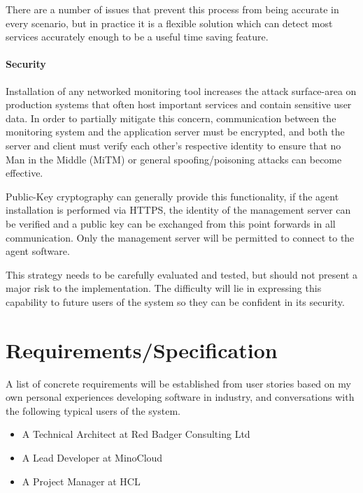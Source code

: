 \documentclass{cshonours}
\begin{document}
There are a number of issues that prevent this process from being accurate in every scenario, but in practice it is a flexible solution which can detect most services accurately enough to be a useful time saving feature.

\paragraph{Security} Installation of any networked monitoring tool increases the attack surface-area on production systems that often host important services and contain sensitive user data. In order to partially mitigate this concern, communication between the monitoring system and the application server must be encrypted, and both the server and client must verify each other’s respective identity to ensure that no Man in the Middle (MiTM) or general spoofing/poisoning attacks can become effective.

Public-Key cryptography can generally provide this functionality, if the agent installation is performed via HTTPS, the identity of the management server can be verified and a public key can be exchanged from this point forwards in all communication. Only the management server will be permitted to connect to the agent software.

This strategy needs to be carefully evaluated and tested, but should not present a major risk to the implementation. The difficulty will lie in expressing this capability to future users of the system so they can be confident in its security.

\section{Requirements/Specification}

A list of concrete requirements will be established from user stories based on my own personal experiences developing software in industry, and conversations with the following typical users of the system.

\begin{itemize}
  \item A Technical Architect at Red Badger Consulting Ltd
  \item A Lead Developer at MinoCloud
  \item A Project Manager at HCL
\end{itemize}

% 
% 
% 
% 
% 
% 
% 

\printbibliography[title=References]
% 
\end{document}
